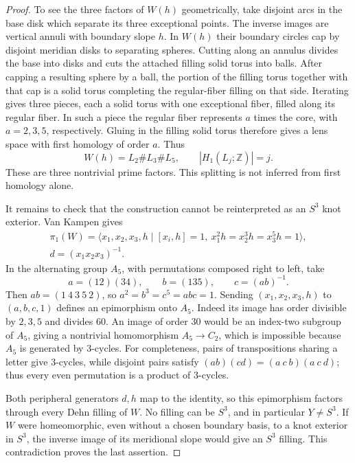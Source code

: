 \documentclass[11pt]{article}
\theoremstyle{remark}
\newcommand{\Z}{\mathbb Z}
\begin{document}
\begin{proof}
To see the three factors of $W(h)$ geometrically, take disjoint arcs in the base disk which separate its three exceptional points. The inverse images are vertical annuli with boundary slope $h$. In $W(h)$ their boundary circles cap by disjoint meridian disks to separating spheres. Cutting along an annulus divides the base into disks and cuts the attached filling solid torus into balls. After capping a resulting sphere by a ball, the portion of the filling torus together with that cap is a solid torus completing the regular-fiber filling on that side. Iterating gives three pieces, each a solid torus with one exceptional fiber, filled along its regular fiber. In such a piece the regular fiber represents $a$ times the core, with $a=2,3,5$, respectively. Gluing in the filling solid torus therefore gives a lens space with first homology of order $a$. Thus
\[
 W(h)=L_2\#L_3\#L_5,\qquad |H_1(L_j;\Z)|=j.
\]
These are three nontrivial prime factors. This splitting is not inferred from first homology alone.

It remains to check that the construction cannot be reinterpreted as an $S^3$ knot exterior. Van Kampen gives
\[
 \begin{gathered}
 \pi_1(W)=\langle x_1,x_2,x_3,h\mid [x_i,h]=1,\
 x_1^2h=x_2^3h=x_3^5h=1\rangle,\\
 d=(x_1x_2x_3)^{-1}.
 \end{gathered}
\]
In the alternating group $A_5$, with permutations composed right to left, take
\[
 a=(12)(34),\qquad b=(135),\qquad c=(ab)^{-1}.
\]
Then $ab=(1\ 4\ 3\ 5\ 2)$, so $a^2=b^3=c^5=abc=1$. Sending $(x_1,x_2,x_3,h)$ to $(a,b,c,1)$ defines an epimorphism onto $A_5$. Indeed its image has order divisible by $2,3,5$ and divides $60$. An image of order $30$ would be an index-two subgroup of $A_5$, giving a nontrivial homomorphism $A_5\to C_2$, which is impossible because $A_5$ is generated by $3$-cycles. For completeness, pairs of transpositions sharing a letter give $3$-cycles, while disjoint pairs satisfy $(ab)(cd)=(a\ c\ b)(a\ c\ d)$; thus every even permutation is a product of $3$-cycles.

Both peripheral generators $d,h$ map to the identity, so this epimorphism factors through every Dehn filling of $W$. No filling can be $S^3$, and in particular $Y\ne S^3$. If $W$ were homeomorphic, even without a chosen boundary basis, to a knot exterior in $S^3$, the inverse image of its meridional slope would give an $S^3$ filling. This contradiction proves the last assertion.
\end{proof}
\end{document}
